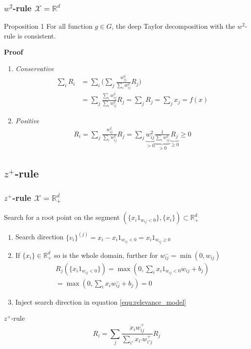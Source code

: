 \documentclass{beamer}
\begin{document}
\begin{frame}
\frametitle{$w^2$-rule $\mathcal{X}=\mathbb{R}^d$}
\vspace{0.3cm}
\begin{block}{Proposition 1}
For all function $g \in G$, the deep Taylor decomposition with the $w^2$-rule is consistent.
\end{block}
\textbf{Proof}\\
\begin{enumerate}
\item \textit{Conservative}
\begin{align*}
\sum_i R_i &= \sum_i\Big(\sum_j \frac{w_{ij}^2}{\sum_iw_{ij}^2}R_j\Big)\\
   		&= \sum_j \frac{\sum_i w_{ij}^2}{\sum_iw_{ij}^2}R_j = \sum_j R_j = \sum_j x_j = f(x)
\end{align*}
\item \textit{Positive}
\begin{align*}
R_i = \sum_j \frac{w_{ij}^2}{\sum_i w_{ij}^2}R_j = \sum_j \underbrace{w_{ij}^2}_{>0}  \underbrace{\frac{1}{\sum_i w_{ij}^2}}_{>0}  \underbrace{R_j}_{\geq 0} \geq 0
\end{align*}
\end{enumerate}


\end{frame}




\subsection[$z^+$-rule]{$z^+$-rule}


\begin{frame}
\frametitle{$z^+$-rule $\mathcal{X}=\mathbb{R}_+^d$}
\vspace{0.25cm}
Search for a root point on the segment $(\{x_i 1_{w_{ij}<0}\},\{x_i\})\subset \mathbb{R}_+^d$\\
\begin{enumerate}
	\item Search direction $\{v_i\}^{(j)} = x_i - x_i 1_{w_{ij}<0} = x_i 1_{w_{ij}\geq0}$
	\item If $\{x_i\} \in \mathbb{R}_+^d$ so is the whole domain, further for $w_{ij}^-=\min(0,w_{ij})$
	\
	\begin{align*}
		R_j(\{x_i1_{w_{ij}<0}\}) = \max(0, \sum_i x_i 1_{w_{ij}<0} w_{ij} + b_j)\\
		= \max(0, \sum_i x_i  w_{ij}^- + b_j) = 0
	\end{align*}
	
	\item Inject search direction in equation \eqref{equ:relevance_model}
\end{enumerate}


\begin{block}{$z^+$-rule}
\begin{equation*}
R_i =  \sum_j \frac{x_i w_{ij}^+}{\sum_{i'} x_{i'} w_{i'j}^+} R_j
\end{equation*}
\end{block}

\end{frame}
\end{document}
